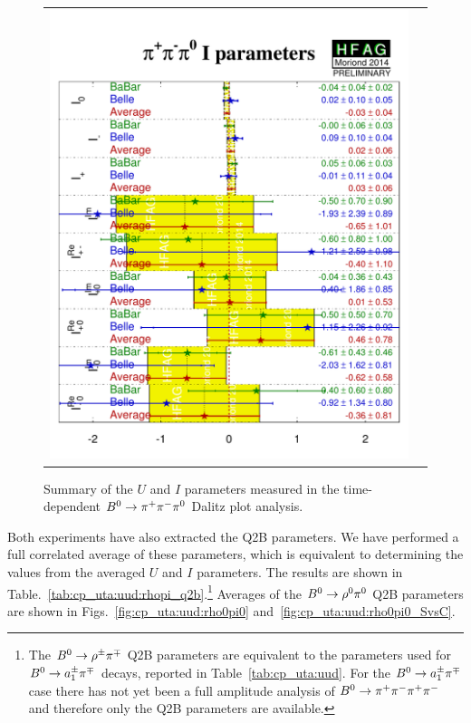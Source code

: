 \begin{figure}[htb]
\begin{center}
\begin{tabular}{cc}
{        \includegraphics{figures/cp_uta/pi+pi-pi0_I}
      }
    \end{tabular}
  \end{center}
  \vspace{-0.8cm}
  \caption{
    Summary of the $U$ and $I$ parameters measured in the 
    time-dependent $B^0 \to \pi^+\pi^-\pi^0$ Dalitz plot analysis.
  }
  \label{fig:cp_uta:uud:uandi}
\end{figure}

Both experiments have also extracted the Q2B parameters.
We have performed a full correlated average of these parameters,
which is equivalent to determining the values from the 
averaged $U$ and $I$ parameters.
The results are shown in Table.~\ref{tab:cp_uta:uud:rhopi_q2b}.\footnote{
  The $B^0 \to \rho^\pm \pi^\mp$ Q2B parameters are equivalent to the
  parameters used for $B^0 \to a_1^\pm \pi^\mp$ decays, reported in
  Table~\ref{tab:cp_uta:uud}.   
  For the $B^0 \to a_1^\pm \pi^\mp$ case there has not yet been a full
  amplitude analysis of $B^0 \to \pi^+\pi^-\pi^+\pi^-$ and therefore only the
  Q2B parameters are available.
}
Averages of the $B^0 \to \rho^0\pi^0$ Q2B parameters are shown in 
Figs.~\ref{fig:cp_uta:uud:rho0pi0} and~\ref{fig:cp_uta:uud:rho0pi0_SvsC}.

